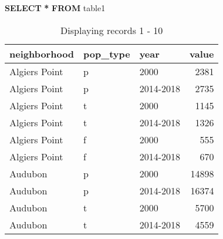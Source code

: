 \documentclass[
]{article}
\newenvironment{Shaded}{\begin{snugshade}}{\end{snugshade}}
\newcommand{\KeywordTok}[1]{\textcolor[rgb]{0.13,0.29,0.53}{\textbf{#1}}}
\newcommand{\NormalTok}[1]{#1}
\newcommand{\OperatorTok}[1]{\textcolor[rgb]{0.81,0.36,0.00}{\textbf{#1}}}
\begin{document}
\begin{Shaded}
\begin{Highlighting}[]

 \KeywordTok{SELECT} \OperatorTok{*} \KeywordTok{FROM}\NormalTok{ table1}
\end{Highlighting}
\end{Shaded}

\begin{table}

\caption{\label{tab:unnamed-chunk-16}Displaying records 1 - 10}
\centering
\begin{tabular}[t]{l|l|l|r}
\hline
neighborhood & pop\_type & year & value\\
\hline
Algiers Point & p & 2000 & 2381\\
\hline
Algiers Point & p & 2014-2018 & 2735\\
\hline
Algiers Point & t & 2000 & 1145\\
\hline
Algiers Point & t & 2014-2018 & 1326\\
\hline
Algiers Point & f & 2000 & 555\\
\hline
Algiers Point & f & 2014-2018 & 670\\
\hline
Audubon & p & 2000 & 14898\\
\hline
Audubon & p & 2014-2018 & 16374\\
\hline
Audubon & t & 2000 & 5700\\
\hline
Audubon & t & 2014-2018 & 4559\\
\hline
\end{tabular}
\end{table}
\end{document}
